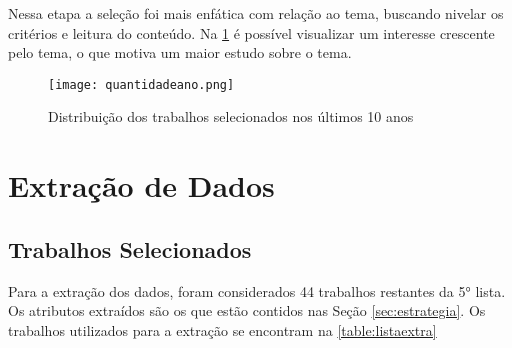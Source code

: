 Nessa etapa a seleção foi mais enfática com relação ao tema, buscando nivelar os critérios e leitura do conteúdo.
Na \ref{fig:qtdano} é possível visualizar um interesse crescente pelo tema, o que motiva um maior estudo sobre o tema.


\begin{figure}[htb]
	\centering
	\caption{Distribuição dos trabalhos selecionados nos últimos 10 anos}
	\texttt{[image: quantidadeano.png]}
	\label{fig:qtdano}
\end{figure}
\newpage
\section{Extração de Dados}

\subsection{Trabalhos Selecionados}

Para a extração dos dados, foram considerados 44 trabalhos restantes da 5° lista. Os atributos extraídos são os que estão contidos nas Seção \ref{sec:estrategia}. Os trabalhos utilizados para a extração se encontram na \ref{table:listaextra}

